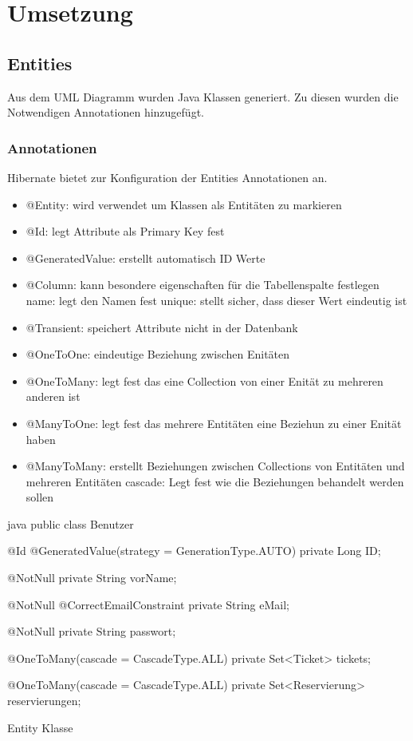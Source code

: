 \section{Umsetzung}

\subsection{Entities}

Aus dem UML Diagramm wurden Java Klassen generiert. Zu diesen wurden die Notwendigen Annotationen hinzugefügt. 

\subsubsection{Annotationen}

	Hibernate bietet zur Konfiguration der Entities Annotationen an. 
	
	\begin{itemize}
		\item[] @Entity: wird verwendet um Klassen als Entitäten zu markieren
		\item[] @Id: legt Attribute als Primary Key fest
		\item[] @GeneratedValue: erstellt automatisch ID Werte
		\item[] @Column: kann besondere eigenschaften für die Tabellenspalte festlegen
		\subitem name: legt den Namen fest
		\subitem unique: stellt sicher, dass dieser Wert eindeutig ist
		\item[] @Transient: speichert Attribute nicht in der Datenbank
		\item[] @OneToOne: eindeutige Beziehung zwischen Enitäten
		\item[] @OneToMany: legt fest das eine Collection von einer Enität zu mehreren anderen ist
		\item[] @ManyToOne: legt fest das mehrere Entitäten eine Beziehun zu einer Enität haben
		\item[] @ManyToMany: erstellt Beziehungen zwischen Collections von Entitäten und mehreren Entitäten
		\subitem cascade: Legt fest wie die Beziehungen behandelt werden sollen
		  
	\end{itemize}

	\begin{listing}
	\begin{code}[]{java}
	public class Benutzer {
		
		@Id
		@GeneratedValue(strategy = GenerationType.AUTO)
		private Long ID;
		
		@NotNull
		private String vorName;
		
		@NotNull
		@CorrectEmailConstraint
		private String eMail;
		
		@NotNull
		private String passwort;
		
		@OneToMany(cascade = CascadeType.ALL)
		private Set<Ticket> tickets;
		
		@OneToMany(cascade = CascadeType.ALL)
		private Set<Reservierung> reservierungen;
	}
	\end{code}
	\caption{Entity Klasse}
	\end{listing}

